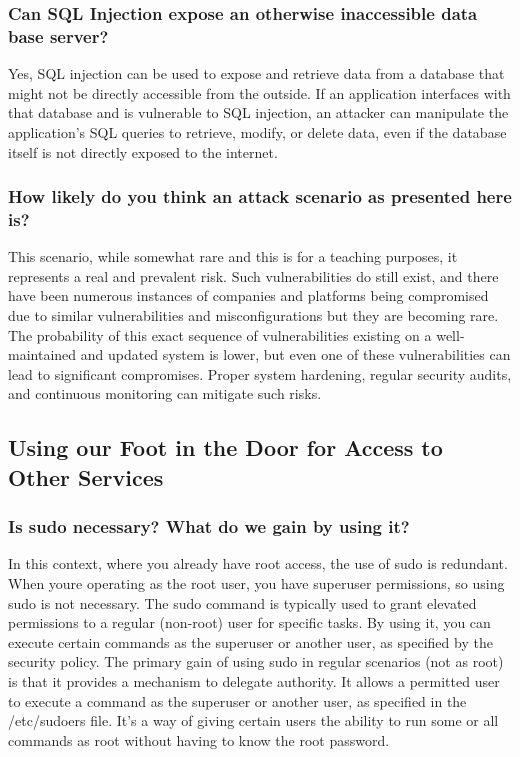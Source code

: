 \subsubsection{Can SQL Injection expose an otherwise inaccessible data base server?}
Yes, SQL injection can be used to expose and retrieve data from a database that might not
be directly accessible from the outside. If an application interfaces with that database and is
vulnerable to SQL injection, an attacker can manipulate the application's SQL queries to
retrieve, modify, or delete data, even if the database itself is not directly exposed to the
internet.


\subsubsection{How likely do you think an attack scenario as presented here is?}
This scenario, while somewhat rare and this is for a teaching purposes, it represents a real and
prevalent risk. Such vulnerabilities do still exist, and there have been numerous
instances of companies and platforms being compromised due to similar vulnerabilities and
misconfigurations but they are becoming rare. The probability of this exact sequence of vulnerabilities existing on a
well-maintained and updated system is lower, but even one of these vulnerabilities can lead
to significant compromises. Proper system hardening, regular security audits, and
continuous monitoring can mitigate such risks.

\subsection{Using our Foot in the Door for Access to Other Services}

\subsubsection{Is sudo necessary? What do we gain by using it?}
In this context, where you already have root access, the use of sudo is redundant. When
youre operating as the root user, you have superuser permissions, so using sudo
is not necessary. The sudo command is typically used to grant elevated permissions to a
regular (non-root) user for specific tasks. By using it, you can execute certain commands as
the superuser or another user, as specified by the security policy.
The primary gain of using sudo in regular scenarios (not as root) is that it provides a
mechanism to delegate authority. It allows a permitted user to execute a command as the
superuser or another user, as specified in the /etc/sudoers file. It's a way of giving certain
users the ability to run some or all commands as root without having to know the root
password.


